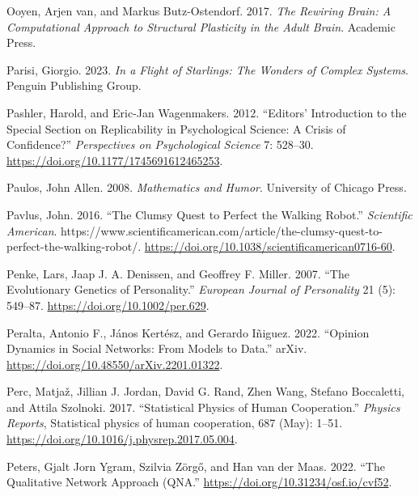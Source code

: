 \documentclass[
  letterpaper,
]{scrbook}
\newlength{\cslhangindent}
\newlength{\cslentryspacingunit} %
\newenvironment{CSLReferences}[2] %
 {%
  \setlength{\parindent}{0pt}
  \ifodd #1
  \let\oldpar\par
  \def\par{\hangindent=\cslhangindent\oldpar}
  \fi
  \setlength{\parskip}{#2\cslentryspacingunit}
 }%
 {}
\begin{document}
\begin{CSLReferences}{1}{0}
\leavevmode{}%
Ooyen, Arjen van, and Markus Butz-Ostendorf. 2017. \emph{The {Rewiring
Brain}: {A Computational Approach} to {Structural Plasticity} in the
{Adult Brain}}. {Academic Press}.

\leavevmode{}%
Parisi, Giorgio. 2023. \emph{In a Flight of Starlings: The Wonders of
Complex Systems}. Penguin Publishing Group.

\leavevmode{}%
Pashler, Harold, and Eric-Jan Wagenmakers. 2012. {``Editors'
Introduction to the Special Section on Replicability in Psychological
Science: {A} Crisis of Confidence?''} \emph{Perspectives on
Psychological Science} 7: 528--30.
\url{https://doi.org/10.1177/1745691612465253}.

\leavevmode{}%
Paulos, John Allen. 2008. \emph{Mathematics and {Humor}}. {University of
Chicago Press}.

\leavevmode{}%
Pavlus, John. 2016. {``The {Clumsy Quest} to {Perfect} the {Walking
Robot}.''} \emph{Scientific American}.
https://www.scientificamerican.com/article/the-clumsy-quest-to-perfect-the-walking-robot/.
\url{https://doi.org/10.1038/scientificamerican0716-60}.

\leavevmode{}%
Penke, Lars, Jaap J. A. Denissen, and Geoffrey F. Miller. 2007. {``The
Evolutionary Genetics of Personality.''} \emph{European Journal of
Personality} 21 (5): 549--87. \url{https://doi.org/10.1002/per.629}.

\leavevmode{}%
Peralta, Antonio F., János Kertész, and Gerardo Iñiguez. 2022.
{``Opinion Dynamics in Social Networks: {From} Models to Data.''}
{arXiv}. \url{https://doi.org/10.48550/arXiv.2201.01322}.

\leavevmode{}%
Perc, Matjaž, Jillian J. Jordan, David G. Rand, Zhen Wang, Stefano
Boccaletti, and Attila Szolnoki. 2017. {``Statistical Physics of Human
Cooperation.''} \emph{Physics Reports}, Statistical physics of human
cooperation, 687 (May): 1--51.
\url{https://doi.org/10.1016/j.physrep.2017.05.004}.

\leavevmode{}%
Peters, Gjalt Jorn Ygram, Szilvia Zörgő, and Han van der Maas. 2022.
{``The {Qualitative Network Approach} ({QNA}.''}
\url{https://doi.org/10.31234/osf.io/cvf52}.


\end{CSLReferences}
\end{document}
